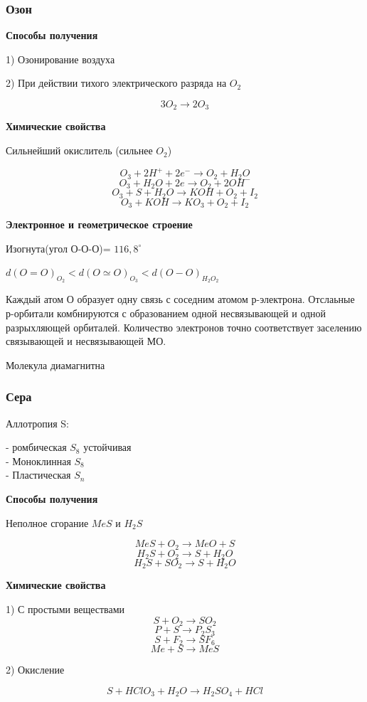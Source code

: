 \documentclass[14pt,a4paper]{scrartcl}
\begin{document}
\subsubsection{Озон}

\textbf{Способы получения}

1) Озонирование воздуха

2) При действии тихого электрического разряда на $O_2$

$$3O_2 \rightarrow 2O_3$$

\textbf{Химические свойства}

Сильнейший окислитель (сильнее $O_2$)

$$O_3 + 2H^+ + 2e^- \rightarrow O_2 + H_2O$$
$$O_3 + H_2O + 2e \rightarrow O_2 + 2OH^-$$
$$O_3 + S + H_2O \rightarrow KOH + O_2 + I_2$$
$$O_3 + KOH \rightarrow KO_3 + O_2 + I_2$$

\textbf{Электронное и геометрическое строение}

Изогнута(угол О-О-О)= $116,8^{\circ}$

$d(O=O)_{O_2}< d(O\simeq O)_{O_3}<d(O-O)_{H_2O_2}$

Каждый атом О образует одну связь с соседним атомом р-электрона. Отслаьные р-орбитали комбнируются с образованием одной несвязывающей и одной разрыхляющей орбиталей. Количество электронов точно соответствует заселению связывающей и несвязывающей МО.

Молекула диамагнитна

\subsubsection{Сера}

Аллотропия S:

- ромбическая $S_8$ устойчивая\\
- Моноклинная $S_8$\\
- Пластическая $S_n$

\textbf{Способы получения}

Неполное сгорание $MeS$ и $H_2S$

$$MeS + O_2 \rightarrow MeO + S$$
$$H_2S + O_2 \rightarrow S + H_2O$$
$$H_2S + SO_2 \rightarrow S+ H_2O$$

\textbf{Химические свойства}

1) С простыми веществами
$$S + O_2 \rightarrow SO_2$$
$$P + S \rightarrow P_2S_3$$
$$S+F_2 \rightarrow SF_6$$
$$Me + S \rightarrow MeS$$

2) Окисление

$$S + HClO_3 + H_2O \rightarrow H_2SO_4 + HCl$$
\end{document}
